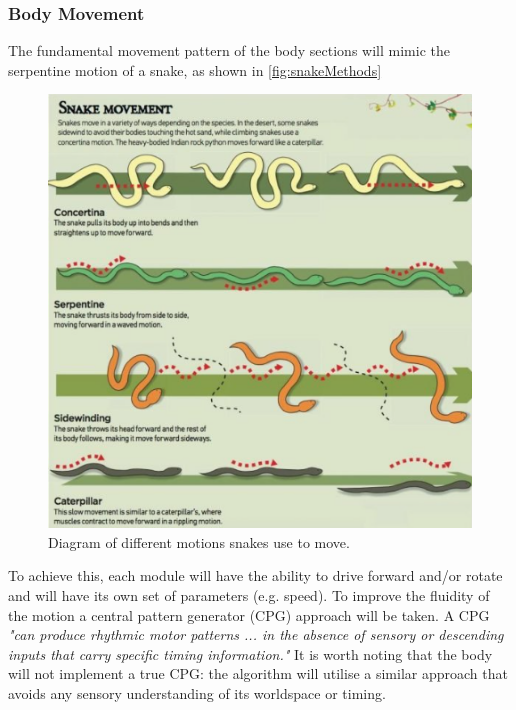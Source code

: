 \documentclass{article}
\begin{document}
\subsubsection{Body Movement}
\label{sec:Body Movement}
The fundamental movement pattern of the body sections will mimic the serpentine motion of a snake, as shown in \autoref{fig:snakeMethods}
\begin{figure}[H]
\centering
\includegraphics[scale=0.8]{snakeMovement}
\caption{Diagram of different motions snakes use to move. \citep{snakeMovement} }
\label{fig:snakeMethods}
\end{figure}
To achieve this, each module will have the ability to drive forward and/or rotate and will have its own set of parameters (e.g. speed). To improve the fluidity of the motion a central pattern generator (CPG) approach will be taken. A CPG \textit{"can produce rhythmic motor patterns ... in the absence of sensory or descending inputs that carry specific timing information."}  It is worth noting that the body will not implement a true CPG: the algorithm will utilise a similar approach that avoids any sensory understanding of its worldspace or timing.\\
\end{document}
